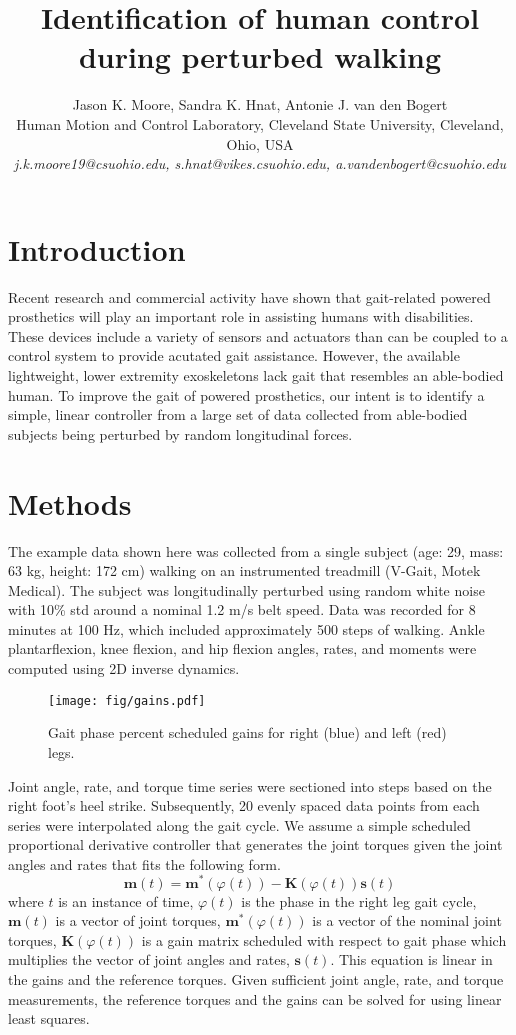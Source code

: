 \documentclass{dw2014}
\title{Identification of human control during perturbed walking}
\author{Jason K. Moore, Sandra K. Hnat, Antonie J. van den Bogert\\
  Human Motion and Control Laboratory, Cleveland State University, Cleveland, Ohio, USA\\
  {\it j.k.moore19@csuohio.edu, s.hnat@vikes.csuohio.edu, a.vandenbogert@csuohio.edu}}
\date{}
\begin{document}
\maketitle

\section*{Introduction}
%
Recent research and commercial activity have shown that gait-related powered
prosthetics will play an important role in assisting humans with disabilities.
These devices include a variety of sensors and actuators than can be coupled to
a control system to provide acutated gait assistance. However, the available
lightweight, lower extremity exoskeletons lack gait that resembles an
able-bodied human. To improve the gait of powered prosthetics, our intent is to
identify a simple, linear controller from a large set of data collected from
able-bodied subjects being perturbed by random longitudinal forces.
%
\section*{Methods}
The example data shown here was collected from a single subject (age: 29, mass:
63 kg, height: 172 cm) walking on an instrumented treadmill (V-Gait, Motek
Medical). The subject was longitudinally perturbed using random white noise
with 10\% std around a nominal 1.2 m/s belt speed. Data was recorded for 8
minutes at 100 Hz, which included approximately 500 steps of walking. Ankle
plantarflexion, knee flexion, and hip flexion angles, rates, and moments were
computed using 2D inverse dynamics.
%
\begin{figure}[hbt]
  \begin{center}
    \texttt{[image: fig/gains.pdf]}
    \caption{Gait phase percent scheduled gains for right (blue) and left (red) legs.}
    \label{fig:gains}
  \end{center}
\end{figure}

Joint angle, rate, and torque time series were sectioned into steps based on
the right foot's heel strike. Subsequently, 20 evenly spaced data points from
each series were interpolated along the gait cycle. We assume a simple
scheduled proportional derivative controller that generates the joint torques
given the joint angles and rates that fits the following form.
%
\begin{equation}
  \mathbf{m}(t) = \mathbf{m}^*(\varphi(t)) -
  \mathbf{K}(\varphi(t))\mathbf{s}(t)
\end{equation}
%
where $t$ is an instance of time, $\varphi(t)$ is the phase in the right leg
gait cycle, $\mathbf{m}(t)$ is a vector of joint torques,
$\mathbf{m}^*(\varphi(t))$ is a vector of the nominal joint torques,
$\mathbf{K}(\varphi(t))$ is a gain matrix scheduled with respect to gait
phase which multiplies the vector of joint angles and rates, $\mathbf{s}(t)$.
This equation is linear in the gains and the reference torques. Given
sufficient joint angle, rate, and torque measurements, the reference torques
and the gains can be solved for using linear least squares.
%
\end{document}
